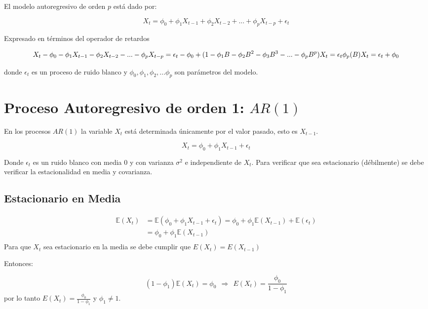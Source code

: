 \documentclass[
  a4paper,
  oneside,
  openany]{book}
\begin{document}
El modelo autoregresivo de orden \(p\) está dado por:

\[
X_t=\phi_0+\phi_1X_{t-1}+\phi_2X_{t-2}+...+\phi_pX_{t-p}+\epsilon_t
\]

Expresado en términos del operador de retardos

\[
X_t-\phi_0-\phi_1X_{t-1}-\phi_2X_{t-2}-...-\phi_pX_{t-p}=\epsilon_t
\\-\phi_0+(1-\phi_1B-\phi_2B^2-\phi_3B^3-...-\phi_pB^p)X_t=\epsilon_t
\\\phi_p(B)X_t=\epsilon_t+\phi_0
\]

donde \(\epsilon_t\) es un proceso de ruido blanco y \(\phi_0,\phi_1,\phi_2,...\phi_p\) son parámetros del modelo.

\hypertarget{proceso-autoregresivo-de-orden-1-ar1}{%
\section{\texorpdfstring{Proceso Autoregresivo de orden 1: \(AR(1)\)}{Proceso Autoregresivo de orden 1: AR(1)}}\label{proceso-autoregresivo-de-orden-1-ar1}}

En los procesos \(AR(1)\) la variable \(X_t\) está determinada únicamente por el valor pasado, esto es \(X_{t-1}\).

\[
X_t=\phi_0+\phi_1X_{t-1}+\epsilon_t
\]

Donde \(\epsilon_t\) es un ruido blanco con media \(0\) y con varianza \(\sigma^2\) e independiente de \(X_t\). Para verificar que sea estacionario (débilmente) se debe verificar la estacionalidad en media y covarianza.

\hypertarget{estacionario-en-media}{%
\subsection{Estacionario en Media}\label{estacionario-en-media}}

\[
\begin{split}
\mathbb{E}(X_t) &= \mathbb{E}(\phi_0+\phi_1X_{t-1}+ \epsilon_t)= \phi_0 + \phi_1 \mathbb{E}(X_{t-1}) + \mathbb{E}(\epsilon_t)\\
& = \phi_0 + \phi_1\mathbb{E}(X_{t-1})\\
\end{split}
\]
Para que \(X_t\) sea estacionario en la media se debe cumplir que \(E(X_t)=E(X_{t-1})\)

Entonces:

\[
(1-\phi_1)\mathbb{E}(X_t)=\phi_0   \       \       \Longrightarrow \  \ E(X_t)= \frac {\phi_0}{1-\phi_1} 
\]
por lo tanto \(E(X_t)=\frac {\phi_0}{1-\phi_1}\) y \(\phi_1\neq1\).
\end{document}
